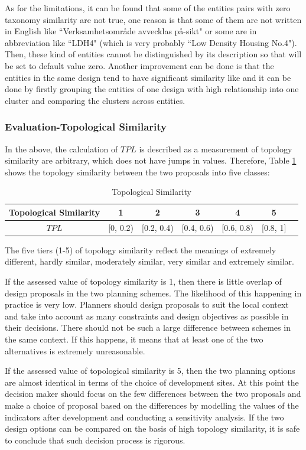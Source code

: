 \par
As for the limitations, it can be found that some of the entities pairs with zero taxonomy similarity are not true, one reason is that some of them are not written in English like ``Verksamhetsområde avvecklas på-sikt" or some are in abbreviation like ``LDH4" (which is very probably ``Low Density Housing No.4"). Then, these kind of entities cannot be distinguished by its description so that will be set to default value zero. Another improvement can be done is that the entities in the same design tend to have significant similarity like and it can be done by firstly grouping the entities of one design with high relationship into one cluster and comparing the clusters across entities.
\subsubsection*{Evaluation-Topological Similarity}
In the above, the calculation of $TPL$ is described as a measurement of topology similarity are arbitrary, which does not have jumps in values. Therefore, Table \ref{eva_topo} shows the topology similarity between the two proposals into five classes: 

\begin{table}[H]
\centering
\caption{Topological Similarity}
\label{eva_topo}
\begin{tabular}{|c|c|c|c|c|c|c|}
\hline
Topological Similarity & 1 & 2 & 3 & 4 & 5          \\ \hline
$TPL$ & [0, 0.2) &  [0.2, 0.4) & [0.4, 0.6)  & [0.6, 0.8)  &[0.8, 1]   \\ \hline
\end{tabular}
\end{table}

The five tiers (1-5) of topology similarity reflect the meanings of extremely different, hardly similar, moderately similar, very similar and extremely similar.

If the assessed value of topology similarity is 1, then there is little overlap of design proposals in the two planning schemes. The likelihood of this happening in practice is very low. Planners should design proposals to suit the local context and take into account as many constraints and design objectives as possible in their decisions. There should not be such a large difference between schemes in the same context. If this happens, it means that at least one of the two alternatives is extremely unreasonable.

If the assessed value of topological similarity is 5, then the two planning options are almost identical in terms of the choice of development sites. At this point the decision maker should focus on the few differences between the two proposals and make a choice of proposal based on the differences by modelling the values of the indicators after development and conducting a sensitivity analysis. If the two design options can be compared on the basis of high topology similarity, it is safe to conclude that such decision process is rigorous.

